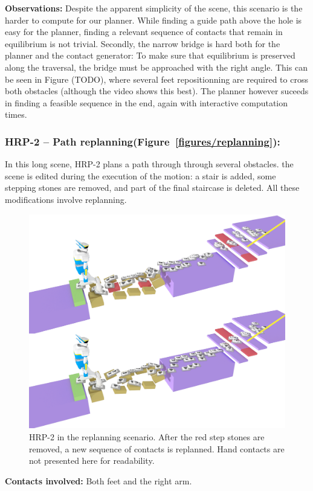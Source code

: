 \noindent\textbf{Observations:} Despite the apparent simplicity of the scene, this scenario is the harder to compute for our planner.
While finding a guide path above the hole is easy for the planner, finding a relevant sequence of contacts that remain in equilibrium is not trivial.
Secondly, the narrow bridge is hard both for the planner and the contact generator: To make sure that equilibrium is preserved along the traversal,
the bridge must be approached with the right angle.
This can be seen in Figure (TODO), where several feet repositionning are required to cross both obstacles (although the video shows this best).
The planner however suceeds in finding a feasible sequence in the end, again with interactive computation times.

\subsubsection{HRP-2 -- Path replanning(Figure~\ref{figures/replanning}):}
In this long scene, HRP-2 plans a path through through several obstacles. the scene is edited during the execution of the motion: a stair is added,
some stepping stones are removed, and part of the final staircase is deleted. All these modifications involve replanning.


\begin{figure}
  \centering
  \includegraphics[width=0.7\linewidth]{figures/replanning}
  \caption{
           HRP-2 in the replanning scenario. After the red step stones are removed, a new sequence of contacts is replanned. Hand contacts
           are not presented here for readability.}
		   \label{fig:replanning}
\end{figure}

\noindent\textbf{Contacts involved:} Both feet and the right arm.

